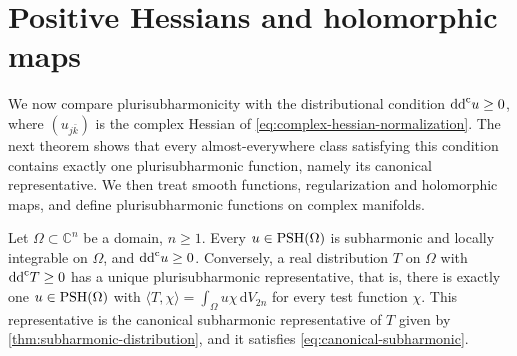 \section{Positive Hessians and holomorphic maps}
\label{sec:psh-hessian-maps}

We now compare plurisubharmonicity with the distributional condition $\mathrm{dd}^{\mathrm{c}} u\geq0$, where $(u_{j\bar k})$ is the complex Hessian of \eqref{eq:complex-hessian-normalization}. The next theorem shows that every almost-everywhere class satisfying this condition contains exactly one plurisubharmonic function, namely its canonical representative. We then treat smooth functions, regularization and holomorphic maps, and define plurisubharmonic functions on complex manifolds.

\begin{theorem}\label{thm:psh-distribution-representative}
Let $\Omega\subset\mathbb{C}^n$ be a domain, $n\ge1$. Every $u\in\mathrm{PSH}(\Omega)$ is subharmonic and locally integrable on $\Omega$, and $\mathrm{dd}^{\mathrm{c}} u\geq0$. Conversely, a real distribution $T$ on $\Omega$ with $\mathrm{dd}^{\mathrm{c}} T\geq0$ has a unique plurisubharmonic representative, that is, there is exactly one $u\in\mathrm{PSH}(\Omega)$ with $\langle T,\chi\rangle=\int_\Omega u\chi\,\mathrm dV_{2n}$ for every test function $\chi$. This representative is the canonical subharmonic representative of $T$ given by \cref{thm:subharmonic-distribution}, and it satisfies \eqref{eq:canonical-subharmonic}.
\end{theorem}
